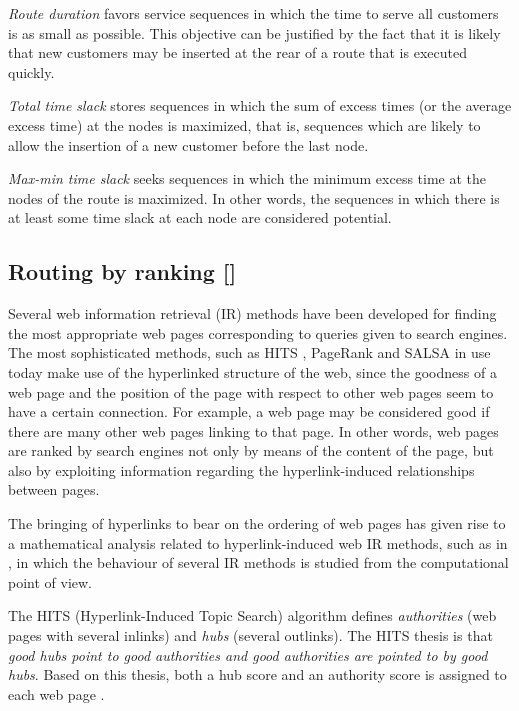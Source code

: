 \documentclass[dissertation,draft*]{aaltoseries}
\begin{document}
\emph{Route duration}
favors service sequences in
which the time to serve all customers is as small as possible. 
This objective can be justified by the fact that 
it is likely that new customers may be inserted at the rear of 
a route that is executed quickly.

\emph{Total time slack} 
stores sequences in which
the sum of excess times (or the average excess time) at the nodes is maximized, that
is, sequences which are likely to allow the insertion of a new customer %
before the last node.

\emph{Max-min time slack} seeks sequences in which the 
minimum excess time at the nodes of the route is maximized. In other words,
the sequences in which there is at least some time slack at each node
are considered potential.








\subsection{Routing by ranking []}
\label{routingbyranking}
Several web information retrieval (IR) methods have been developed
for finding the most appropriate web pages corresponding to 
queries given to search engines. The most sophisticated methods, such as HITS \cite{kleinberg}, PageRank \cite{brin01} and SALSA \cite{lempel}
in use today make use of the hyperlinked structure of the web, since
the goodness of a web page and the position of the page with respect to
other web pages seem to have a certain connection. 
For example, a web page may be
considered good if there are many other web pages linking to that page. In other words, 
web pages are ranked by search engines not only by means of the content of the page, but
also by exploiting information regarding the hyperlink-induced relationships between pages.

The bringing of hyperlinks to bear on the ordering of web pages has given rise to
a mathematical analysis related to hyperlink-induced web IR methods, such as in
\cite{farahat, langville, ng, agosti}, in which the 
behaviour of several IR methods is studied from the computational point of view.

The HITS (Hyperlink-Induced Topic Search) algorithm defines \emph{authorities} 
(web pages with several inlinks) and \emph{hubs} (several outlinks). 
The HITS thesis is that \emph{good hubs point to good authorities and good authorities
are pointed to by good hubs}. Based on this thesis, both a hub score and an authority score is assigned to
each web page \cite{langville}. 
\end{document}
